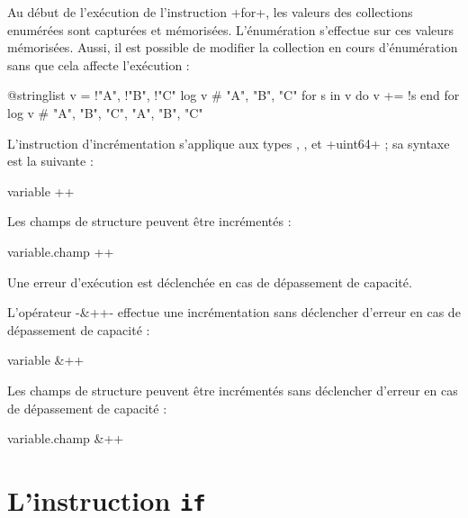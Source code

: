 Au début de l'exécution de l'instruction \ggs+for+, les valeurs des collections enumérées sont capturées et mémorisées. L'énumération s'effectue sur ces valeurs mémorisées. Aussi, il est possible de modifier la collection en cours d'énumération sans que cela affecte l'exécution :
\begin{galgas}
@stringlist v = {!"A", !"B", !"C"}
log v # "A", "B", "C"
for s in v do
  v += !s
end for
log v # "A", "B", "C", "A", "B", "C"
\end{galgas}





















L'instruction d'incrémentation s'applique aux types  ,  ,  et \ggs+uint64+ ; sa syntaxe est la suivante :

\begin{galgasbox}
variable ++
\end{galgasbox}

Les champs de structure peuvent être incrémentés :
\begin{galgasbox}
variable.champ ++
\end{galgasbox}

Une erreur d'exécution est déclenchée en cas de dépassement de capacité.

L'opérateur \ggs-&++- effectue une incrémentation sans déclencher d'erreur en cas de dépassement de capacité :
\begin{galgasbox}
variable &++
\end{galgasbox}

Les champs de structure peuvent être incrémentés sans déclencher d'erreur en cas de dépassement de capacité :
\begin{galgasbox}
variable.champ &++
\end{galgasbox}








\section{L'instruction \texttt{if}}


